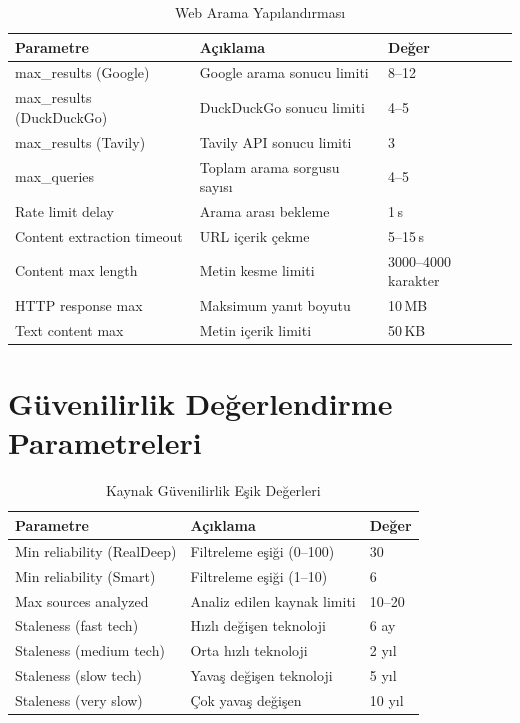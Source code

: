 \begin{table}[H]
\centering
\caption{Web Arama Yap{\i}land{\i}rmas{\i}}
\label{tab:search_params}
\begin{tabularx}{\textwidth}{lXl}
\toprule
\color{chapterBlue}\textbf{Parametre} & \color{chapterBlue}\textbf{A\c{c}{\i}klama} & \color{chapterBlue}\textbf{De\u{g}er} \\
\midrule
max\_results (Google) & Google arama sonucu limiti & 8--12 \\
max\_results (DuckDuckGo) & DuckDuckGo sonucu limiti & 4--5 \\
max\_results (Tavily) & Tavily API sonucu limiti & 3 \\
max\_queries & Toplam arama sorgusu say{\i}s{\i} & 4--5 \\
Rate limit delay & Arama arası bekleme & 1\,s \\
Content extraction timeout & URL i\c{c}erik \c{c}ekme & 5--15\,s \\
Content max length & Metin kesme limiti & 3000--4000 karakter \\
HTTP response max & Maksimum yan{\i}t boyutu & 10\,MB \\
Text content max & Metin i\c{c}erik limiti & 50\,KB \\
\bottomrule
\end{tabularx}
\end{table}

\section{G\"{u}venilirlik De\u{g}erlendirme Parametreleri}

\begin{table}[H]
\centering
\caption{Kaynak G\"{u}venilirlik E\c{s}ik De\u{g}erleri}
\label{tab:reliability_params}
\begin{tabularx}{\textwidth}{lXl}
\toprule
\color{chapterBlue}\textbf{Parametre} & \color{chapterBlue}\textbf{A\c{c}{\i}klama} & \color{chapterBlue}\textbf{De\u{g}er} \\
\midrule
Min reliability (RealDeep) & Filtreleme e\c{s}i\u{g}i (0--100) & 30 \\
Min reliability (Smart) & Filtreleme e\c{s}i\u{g}i (1--10) & 6 \\
Max sources analyzed & Analiz edilen kaynak limiti & 10--20 \\
Staleness (fast tech) & H{\i}zl{\i} de\u{g}i\c{s}en teknoloji & 6 ay \\
Staleness (medium tech) & Orta h{\i}zl{\i} teknoloji & 2 y{\i}l \\
Staleness (slow tech) & Yavaş de\u{g}i\c{s}en teknoloji & 5 y{\i}l \\
Staleness (very slow) & \c{C}ok yavaş de\u{g}i\c{s}en & 10 y{\i}l \\
\bottomrule
\end{tabularx}
\end{table}


